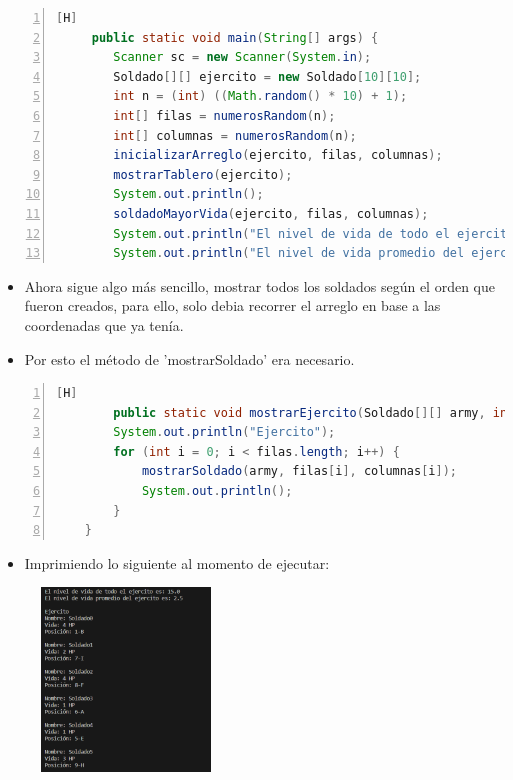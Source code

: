 \documentclass{article}
\begin{document}
	\begin{lstlisting}[language=java,caption={Método main hasta ahora}, numbers=left][H]
	 public static void main(String[] args) {
        Scanner sc = new Scanner(System.in);
        Soldado[][] ejercito = new Soldado[10][10];
        int n = (int) ((Math.random() * 10) + 1);
        int[] filas = numerosRandom(n);
        int[] columnas = numerosRandom(n);
        inicializarArreglo(ejercito, filas, columnas);
        mostrarTablero(ejercito);
        System.out.println();
        soldadoMayorVida(ejercito, filas, columnas);
        System.out.println("El nivel de vida de todo el ejercito es: " + promedioYTotal(ejercito, filas, columnas)[0]);
        System.out.println("El nivel de vida promedio del ejercito es: " + promedioYTotal(ejercito, filas, columnas)[1]);
	\end{lstlisting}
	\begin{itemize}	
		\item Ahora sigue algo más sencillo, mostrar todos los soldados según el orden que fueron creados, para ello, solo debia recorrer el arreglo en base a las coordenadas que ya tenía.
		\item Por esto el método de 'mostrarSoldado' era necesario.
	\end{itemize}
	\begin{lstlisting}[language=java,caption={Mostrar ejército}, numbers=left][H]
	 	public static void mostrarEjercito(Soldado[][] army, int[] filas, int[] columnas) {
        System.out.println("Ejercito");
        for (int i = 0; i < filas.length; i++) {
            mostrarSoldado(army, filas[i], columnas[i]);
            System.out.println();
        }
    }
	\end{lstlisting}
	
	\begin{itemize}	
		\item Imprimiendo lo siguiente al momento de ejecutar:
	\end{itemize}
	
	\begin{figure}[H]
		\centering
	\includegraphics[width=0.4\textwidth,keepaspectratio]{img/captura3.png}
	\end{figure}
	
\end{document}
